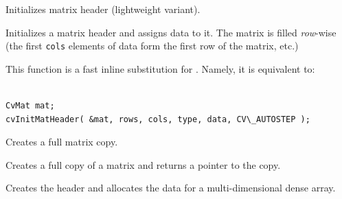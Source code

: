 \label{Mat}

Initializes matrix header (lightweight variant).


\begin{description}
\end{description}

Initializes a matrix header and assigns data to it. The matrix is filled \textit{row}-wise (the first \texttt{cols} elements of data form the first row of the matrix, etc.)

This function is a fast inline substitution for . Namely, it is equivalent to:

\begin{lstlisting}

CvMat mat;
cvInitMatHeader( &mat, rows, cols, type, data, CV\_AUTOSTEP );

\end{lstlisting}
\fi

\label{CloneMat}

Creates a full matrix copy.


\begin{description}
\end{description}

Creates a full copy of a matrix and returns a pointer to the copy.

\label{CreateMatND}

Creates the header and allocates the data for a multi-dimensional dense array.


